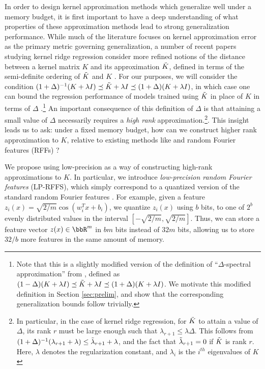 In order to design kernel approximation methods which generalize well under a memory budget, it is first important to have a deep understanding of what properties of these approximation methods lead to strong generalization performance.
While much of the literature focuses on kernel approximation error as the primary metric governing generalization, a number of recent papers studying kernel ridge regression consider more refined notions of the distance between a kernel matrix $K$ and its approximation $\tilde{K}$, defined in terms of the semi-definite ordering of $\tilde{K}$ and $K$ \citep{avron17,musco17,alaoui15,rudi15}. For our purposes, we will consider the condition $(1+\Delta)^{-1}(K+\lambda I) \preceq \tilde{K} + \lambda I \preceq (1+\Delta)(K+\lambda I)$, in which case one can bound the regression performance of models trained using $\tilde{K}$ in place of $K$ in terms of $\Delta$ \citep{avron17}.\footnote{Note that this is a slightly modified version of the definition of ``$\Delta$-spectral approximation'' from \citet{avron17}, defined as $(1-\Delta)(K+\lambda I) \preceq \tilde{K} + \lambda I \preceq (1+\Delta)(K+\lambda I)$.  We motivate this modified definition in Section \ref{sec:prelim}, and show that the corresponding generalization bounds follow trivially.}  An important consequence of this definition of $\Delta$ is that attaining a small value of $\Delta$ necessarily requires a \emph{high rank} approximation.\footnote{In particular, in the case of kernel ridge regression, for $\tilde{K}$ to attain a value of $\Delta$, its rank $r$ must be large enough such that $\lambda_{r+1} \leq \lambda\Delta$. This follows from $(1+\Delta)^{-1}(\lambda_{r+1}+\lambda) \leq \tilde{\lambda}_{r+1}+\lambda$, and the fact that $\tilde{\lambda}_{r+1}=0$ if $\tilde{K}$ is rank $r$.  Here, $\lambda$ denotes the regularization constant, and $\lambda_{i}$ is the $i^{th}$ eigenvalues of $K$}. This insight leads us to ask: under a fixed memory budget, how can we construct higher rank approximation to $K$, relative to existing methods like \Nystrom \citep{nystrom} and random Fourier features (RFFs) \citep{rahimi07random}?

We propose using low-precision as a way of constructing high-rank approximations to $K$.  In particular, we introduce \emph{low-precision random Fourier features} (LP-RFFS), which simply correspond to a quantized version of the standard random Fourier features \citep{rahimi07random}.  For example, given a feature $z_i(x) = \sqrt{2/m}\cos(w_i^Tx+b_i)$, we quantize $z_i(x)$ using $b$ bits, to one of $2^b$ evenly distributed values in the interval $[-\sqrt{2/m},\sqrt{2/m}]$. Thus, we can store a feature vector $z(x)\in\RR^m$ in $bm$ bits instead of $32m$ bits, allowing us to store $32/b$ more features in the same amount of memory.

